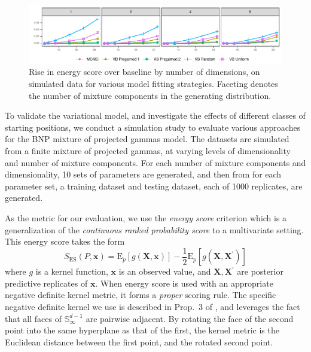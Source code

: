 \begin{figure}[htb]
    \caption{Rise in energy score over baseline by number of dimensions, on simulated data 
    for various model fitting strategies. Faceting denotes the number of mixture components 
    in the generating distribution. \label{fig:energyscore}}
    \includegraphics[width=\linewidth]{plots/energy_score}
\end{figure}

To validate the variational model, and investigate the effects of different classes of 
    starting positions, we conduct a simulation study to evaluate various approaches for
    the BNP mixture of projected gammas model.  The datasets are simulated from a finite
    mixture of projected gammas, at varying levels of dimensionality and number of mixture
    components.  For each number of mixture components and dimensionality, 10 sets of
    parameters are generated, and then from for each parameter set, a training dataset and 
    testing dataset, each of \num{1000} replicates, are generated.

As the metric for our evaluation, we use the \emph{energy score} criterion \citep{gneiting2007}
    which is a generalization of the \emph{continuous ranked probability score} to a multivariate
    setting.  This energy score takes the form
    \[
      S_{\text{ES}}(P, \bm{x}) = \text{E}_p\left[g(\bm{X},\bm{x})\right] - 
        \frac{1}{2}\text{E}_p\left[g(\bm{X},\bm{X}^{\prime})\right]
    \]
    where $g$ is a kernel function, $\bm{x}$ is an observed value, and 
    $\bm{X},\bm{X}^{\prime}$ are posterior predictive replicates of $\bm{x}$.
    When energy score is used with an appropriate negative definite kernel 
    metric, it forms a \emph{proper} scoring rule. The specific negative 
    definite kernel we use is described in Prop.~3 of \cite{trubey:pg}, 
    and leverages the fact that all faces of $\mathbb{S}_{\infty}^{d-1}$
    are pairwise adjacent.  By rotating the face of the second point into 
    the same hyperplane as that of the first, the kernel metric is the Euclidean 
    distance between the first point, and the rotated second point.
    
